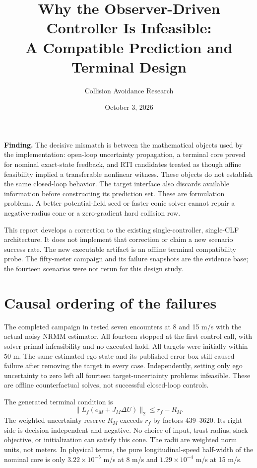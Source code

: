 \documentclass[11pt]{article}
\title{Why the Observer-Driven Controller Is Infeasible:\\A Compatible Prediction and Terminal Design}
\author{Collision Avoidance Research}
\date{October 3, 2026}
\begin{document}
\maketitle

\textbf{Finding.} The decisive mismatch is between the mathematical objects
used by the implementation: open-loop uncertainty propagation, a terminal
core proved for nominal exact-state feedback, and RTI candidates treated as
though affine feasibility implied a transferable nonlinear witness. These
objects do not establish the same closed-loop behavior. The target interface
also discards available information before constructing its prediction set.
These are formulation problems. A better potential-field seed or faster
conic solver cannot repair a negative-radius cone or a zero-gradient hard
collision row.

This report develops a correction to the existing single-controller,
single-CLF architecture. It does not implement that correction or claim a new
scenario success rate. The new executable artifact is an offline terminal
compatibility probe. The fifty-meter campaign and its failure snapshots are
the evidence base; the fourteen scenarios were not rerun for this design study.

\section{Causal ordering of the failures}
The completed campaign in
 tested seven encounters at
8 and 15 m/s with the actual noisy NRMM estimator. All fourteen stopped at
the first control call, with solver primal infeasibility and no executed
hold. All targets were initially within 50 m. The same estimated ego state
and its published error box still caused failure after removing the target
in every case. Independently, setting only ego uncertainty to zero left all
fourteen target-uncertainty problems infeasible. These are offline
counterfactual solves, not successful closed-loop controls.

The generated terminal condition is
\begin{equation}\label{eq:empty}
 \|L_f(e_M+J_M\Delta U)\|_2\le r_f-R_M.
\end{equation}
The weighted uncertainty reserve $R_M$ exceeds $r_f$ by factors 439--3620.
Its right side is decision independent and negative. No choice of input,
trust radius, slack objective, or initialization can satisfy this cone.
The radii are weighted norm units, not meters. In physical terms, the pure
longitudinal-speed half-width of the nominal core is only
$3.22\times10^{-5}$ m/s at 8 m/s and $1.29\times10^{-4}$ m/s at 15 m/s.
\end{document}
